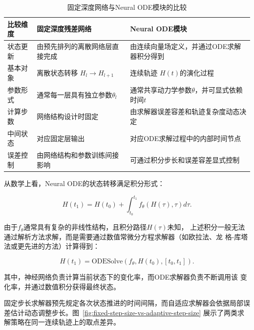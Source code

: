 \documentclass[UTF8,a4paper,zihao=-4,oneside,openany]{ctexbook}
\begin{document}
\begin{table}[htbp]
\centering
\caption{固定深度网络与Neural ODE模块的比较}
\begin{tabular}{p{3cm}p{5cm}p{5cm}}
\hline
比较维度 & 固定深度残差网络 & Neural ODE模块 \\
\hline

状态更新 &
由预先排列的离散网络层直接完成 &
由连续向量场定义，并通过ODE求解器积分得到 \\

基本对象 &
离散状态转移
$H_l\rightarrow H_{l+1}$ &
连续轨迹
$H(t)$的演化过程 \\

参数形式 &
通常每一层具有独立参数$\theta_l$ &
通常共享动力学参数$\theta$，并可显式依赖时间$t$ \\

计算步数 &
网络结构设计时固定 &
由求解器误差容差和轨迹复杂度动态决定 \\

中间状态 &
对应固定层输出 &
对应ODE求解过程中的内部时间节点 \\

误差控制 &
由网络结构和参数训练间接影响 &
可通过积分步长和误差容差显式控制 \\

\hline
\end{tabular}
\end{table}



从数学上看，Neural ODE的状态转移满足积分形式：

\begin{equation}
H(t_1)
=
H(t_0)
+
\int_{t_0}^{t_1}
f_\theta(H(\tau),\tau)d\tau .
\end{equation}

由于$f_\theta$通常具有复杂的非线性结构，且积分路径$H(\tau)$未知，
上述积分一般无法通过解析方法求解，而是需要通过数值常微分方程求解器（如欧拉法、龙
格-库塔法或更先进的方法）计算得到：

\begin{equation}
H(t_1)
=
\mathrm{ODESolve}
(f_\theta,H(t_0),[t_0,t_1]).
\end{equation}

其中，神经网络负责计算当前状态下的变化率，而ODE求解器负责不断调用该
变化率，并通过数值积分获得最终状态。

固定步长求解器预先规定各次状态推进的时间间隔，而自适应求解器会依据局部误差估计动态调整步长。图~\ref{fig:fixed-step-size-vs-adaptive-step-size} 展示了两类求解策略在同一连续轨迹上的取点差异。
\end{document}
